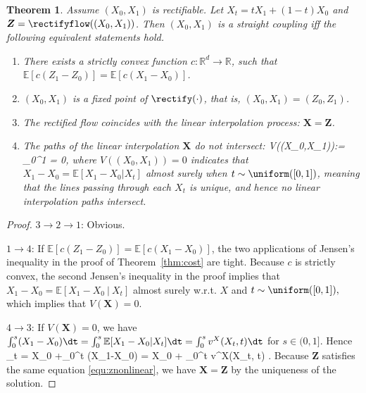 \documentclass[11pt]{article}
\newtheorem{thm}{Theorem}[section]
\newcommand{\E}{\mathbb{E}}
\newcommand{\vv}[1]{\boldsymbol{#1}}
\newcommand{\RR}{\mathbb{R}}
\newcommand{\norm}[1]{\left\|#1\right\|}
\def\bb#1\ee{\begin{align*}#1\end{align*}}
\begin{document}
\begin{thm}\label{thm:straightness} 
Assume $(X_0,X_1)$ is rectifiable. Let $X_t =  tX_1 +(1-t)X_0$ and 
$\vv Z =\rectifyflow((X_0,X_1))$. 
Then $(X_0,X_1)$ is a straight coupling iff the following equivalent statements hold. %
\begin{enumerate} 
\item There exists a strictly convex function $c\colon \RR^d\to \RR$, such that $\E[c(Z_1-Z_0)] = \E[c(X_1-X_0)]$. 
\item $(X_0,X_1)$ is a fixed point of $\rectify(\cdot)$, that is, $(X_0,X_1) = (Z_0,Z_1)$. %
 
\item The rectified flow coincides with the linear interpolation process: $\vv X = \vv Z$. 

\item The paths of the linear interpolation $\vv X$ do not intersect: %
\bbb 
\hspace{-.05\textwidth}
V((X_0,X_1)):= 
\int_0^1 \e{\norm{X_1-X_0-\e{X_1-X_0~|~X_t}}^2} \dt = 0, 
\eee 
where %
 $V((X_0,X_1))=0$ 
 indicates 
 that $X_1-X_0=\E[X_1-X_0|X_t]$ almost surely when $t\sim \uniform([0,1])$, 
 meaning that the lines passing through each $X_t$ is unique, and hence no linear interpolation paths intersect. 
\end{enumerate}
\end{thm}
\begin{proof}

$3 \to 2\to 1$: Obvious. 



$1\to 4$: 
If $\E[c(Z_1-Z_0)] = \E[c(X_1-X_0)]$, the two applications of 
Jensen's inequality in the proof of Theorem~\ref{thm:cost}
are tight. Because $c$ is strictly convex,
the second Jensen's inequality in the proof implies that 
$X_1-X_0 = \E[X_1-X_0~|~X_t]$ almost surely w.r.t. $X$ and $t\sim \uniform([0,1]),$ which implies that $V(\vv X)=0.$

$4\to 3$:   
If $V(\vv X) =0$, we have $\int_0^s( X_1 -X_0) \dt = \int_0^s\E[X_1-X_0|X_t]\dt = \int_0^sv^X(X_t,t)\dt $ for $s\in(0,1]$.
Hence 
\bb 
X_t = X_0 +\int_0^t (X_1-X_0) \dt 
= X_0 + \int_0^t v^X(X_t, t) \dt. 
\ee 
Because $\vv Z$ satisfies the same equation 
\eqref{equ:znonlinear}, we have $\vv X=\vv Z$ by the uniqueness of the solution. 


\end{proof}
\end{document}
